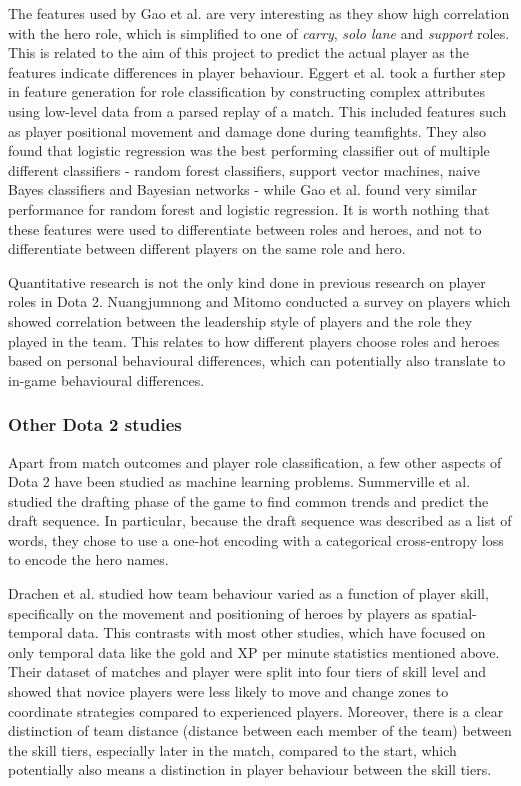 \documentclass[Report.tex]{subfiles}
\begin{document}
The features used by Gao et al. are very interesting as they show high correlation with the hero role, which is simplified to one of \textit{carry}, \textit{solo lane} and \textit{support} roles. This is related to the aim of this project to predict the actual player as the features indicate differences in player behaviour. Eggert et al. \cite{dota-eggert} took a further step in feature generation for role classification by constructing complex attributes using low-level data from a parsed replay of a match. This included features such as player positional movement and damage done during teamfights. They also found that logistic regression was the best performing classifier out of multiple different classifiers - random forest classifiers, support vector machines, naive Bayes classifiers and Bayesian networks - while Gao et al. \cite{dota-gao} found very similar performance for random forest and logistic regression. It is worth nothing that these features were used to differentiate between roles and heroes, and not to differentiate between different players on the same role and hero.

Quantitative research is not the only kind done in previous research on player roles in Dota 2. Nuangjumnong and Mitomo \cite{dota-leadership} conducted a survey on players which showed correlation between the leadership style of players and the role they played in the team. This relates to how different players choose roles and heroes based on personal behavioural differences, which can potentially also translate to in-game behavioural differences.  

\subsubsection{Other Dota 2 studies}
Apart from match outcomes and player role classification, a few other aspects of Dota 2 have been studied as machine learning problems. Summerville et al. \cite{dota-draft} studied the drafting phase of the game to find common trends and predict the draft sequence. In particular, because the draft sequence was described as a list of words, they chose to use a one-hot encoding with a categorical cross-entropy loss to encode the hero names. 

Drachen et al. \cite{dota-skill} studied how team behaviour varied as a function of player skill, specifically on the movement and positioning of heroes by players as spatial-temporal data. This contrasts with most other studies, which have focused on only temporal data like the gold and XP per minute statistics mentioned above. Their dataset of matches and player were split into four tiers of skill level and showed that novice players were less likely to move and change zones to coordinate strategies compared to experienced players. Moreover, there is a clear distinction of team distance (distance between each member of the team) between the skill tiers, especially later in the match, compared to the start, which potentially also means a distinction in player behaviour between the skill tiers. 
\end{document}
